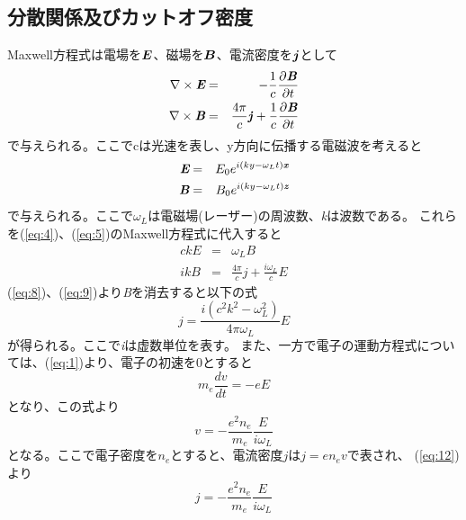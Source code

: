 \documentclass[a4paper,11pt,titlepage]{jarticle}
\newcommand{\bm}[1]{{\mbox{\boldmath $#1$}}}
\numberwithin{equation}{section} %
\begin{document}
  \subsection{分散関係及びカットオフ密度}
  \rm Maxwell方程式は電場を$\bm{E}$、磁場を$\bm{B}$、電流密度を$\bm{j}$として
  \begin{eqnarray}
    \label{eq:4}
    \nabla \times \textit{\textbf{E}} &=& 
    -\frac{1}{c}\frac{\partial \textbf{\textit{\textbf{B}}}}{\partial t}\\
    \label{eq:5}
    \nabla \times \textit{\textbf{B}} &=& \frac{4\pi}{c} 
    \textbf{\textit{j}} +\frac{1}{c}\frac{\partial \textit{\textbf{B}} }{\partial t}
  \end{eqnarray}
  で与えられる。ここでcは光速を表し、y方向に伝播する電磁波を考えると
  \begin{eqnarray}
    \label{eq:6}
    \textit{\textbf{E}}&=&E_0 e^{i(ky-\omega_L t) \textit{\textbf{x}}}\\
    \label{eq:7}
    \textit{\textbf{B}}&=&B_0 e^{i(ky-\omega_L t) \textit{\textbf{z}}}
  \end{eqnarray}
  で与えられる。ここで$\omega_L$は電磁場(レーザー)の周波数、\textit{k}は波数である。
  これらを(\ref{eq:4})、(\ref{eq:5})のMaxwell方程式に代入すると
  \begin{eqnarray}
    \label{eq:8}
    ckE&=&\omega_L B\\
    \label{eq:9}
    ikB&=&\frac{4\pi}{c}j + \frac{i\omega_L}{c} \textit{E}
  \end{eqnarray}
  (\ref{eq:8})、(\ref{eq:9})より\textit{B}を消去すると以下の式
  \begin{equation}
    \label{eq:10}
    j=\frac{i(c^2 k^2 -\omega_L^2)}{4\pi \omega_L}E
  \end{equation}
  が得られる。ここで\textit{i}は虚数単位を表す。
  また、一方で電子の運動方程式については、(\ref{eq:1})より、電子の初速を0とすると
  \begin{equation}
    \label{eq:11}
    m_e \frac{\textit{dv}}{\textit{dt}}=-e\textit{E}
  \end{equation}
  となり、この式より
  \begin{equation}
    \label{eq:12}
    \textit{v}=-{\frac{e^2 n_e}{m_e} \frac{E}{i\omega_L}}
  \end{equation}
  となる。ここで電子密度を$n_e$とすると、電流密度$j$は$j=en_e v$で表され、
  (\ref{eq:12})より
  \begin{equation}
    \label{eq:13}
    j=-\frac{e^2 n_e}{m_e} \frac{E}{i\omega_L}
  \end{equation}
\end{document}
